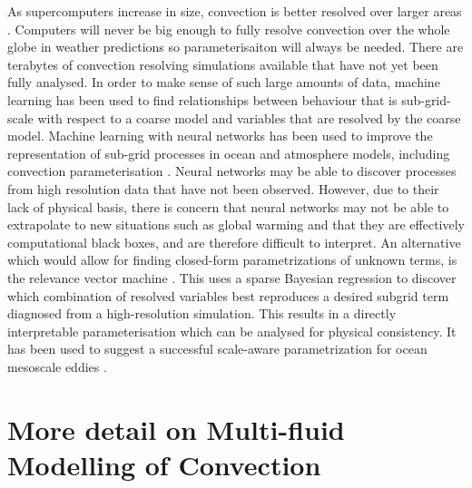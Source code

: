 \documentclass[11pt,a4paper]{article}
\begin{document}
As supercomputers increase in size, convection is better resolved over larger areas \cite[eg.][]{GC17}. Computers will never be big enough to fully resolve convection over the whole globe in weather predictions \cite[eg.][]{SSJ+19} so parameterisaiton will always be needed. There are terabytes of convection resolving simulations available that have not yet been fully analysed. In order to make sense of such large amounts of data, machine learning has been used to find relationships between behaviour that is sub-grid-scale with respect to a coarse model and variables that are resolved by the coarse model. Machine learning with neural networks has been used to improve the representation of sub-grid processes in ocean and atmosphere models, including convection parameterisation \cite[]{ogorman2018}. Neural networks may be able to discover processes from high resolution data that have not been observed. However, due to their lack of physical basis, there is concern that neural networks may not be able to extrapolate to new situations such as global warming and that they are effectively computational black boxes, and are therefore difficult to interpret. An alternative which would allow for finding closed-form parametrizations of unknown terms, is the relevance vector machine \cite[]{tipping2001}. This uses a sparse Bayesian regression to discover which combination of resolved variables best reproduces a desired subgrid term diagnosed from a high-resolution simulation. This results in a directly interpretable parameterisation which can be analysed for physical consistency. It has been used to suggest a successful scale-aware parametrization for ocean mesoscale eddies \cite[]{zanna2020}.

\section{More detail on Multi-fluid Modelling of Convection}
\label{sec:mf}
\end{document}
